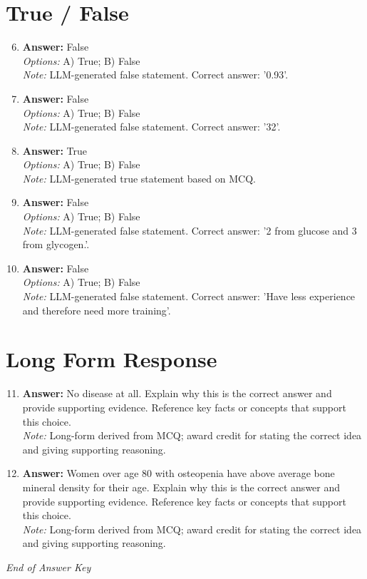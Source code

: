 \documentclass[12pt]{article}
\begin{document}
\section*{True / False}
\begin{enumerate}[label=\arabic*.]
\setcounter{enumi}{5}
\item \textbf{Answer:} False
\\ \textit{Options:} A) True; B) False
\\ \textit{Note:} LLM-generated false statement. Correct answer: '0.93'.
\item \textbf{Answer:} False
\\ \textit{Options:} A) True; B) False
\\ \textit{Note:} LLM-generated false statement. Correct answer: '32'.
\item \textbf{Answer:} True
\\ \textit{Options:} A) True; B) False
\\ \textit{Note:} LLM-generated true statement based on MCQ.
\item \textbf{Answer:} False
\\ \textit{Options:} A) True; B) False
\\ \textit{Note:} LLM-generated false statement. Correct answer: '2 from glucose and 3 from glycogen.'.
\item \textbf{Answer:} False
\\ \textit{Options:} A) True; B) False
\\ \textit{Note:} LLM-generated false statement. Correct answer: 'Have less experience and therefore need more training'.
\end{enumerate}

\section*{Long Form Response}
\begin{enumerate}[label=\arabic*.]
\setcounter{enumi}{10}
\item \textbf{Answer:} No disease at all. Explain why this is the correct answer and provide supporting evidence. Reference key facts or concepts that support this choice.
\\ \textit{Note:} Long-form derived from MCQ; award credit for stating the correct idea and giving supporting reasoning.
\item \textbf{Answer:} Women over age 80 with osteopenia have above average bone mineral density for their age. Explain why this is the correct answer and provide supporting evidence. Reference key facts or concepts that support this choice.
\\ \textit{Note:} Long-form derived from MCQ; award credit for stating the correct idea and giving supporting reasoning.
\end{enumerate}

\vfill
\noindent\textit{End of Answer Key}
\end{document}
